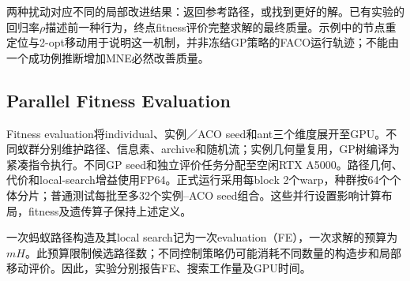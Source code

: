 两种扰动对应不同的局部改进结果：返回参考路径，或找到更好的解。已有实验的回归率$\rho$描述前一种行为，终点fitness评价完整求解的最终质量。示例中的节点重定位与2-opt移动用于说明这一机制，并非冻结GP策略的FACO运行轨迹；不能由一个成功例推断增加MNE必然改善质量。



\subsection{Parallel Fitness Evaluation}
Fitness evaluation将individual、实例／ACO seed和ant三个维度展开至GPU。不同蚁群分别维护路径、信息素、archive和随机流；实例几何量复用，GP树编译为紧凑指令执行。不同GP seed和独立评价任务分配至空闲RTX A5000。路径几何、代价和local-search增益使用FP64。正式运行采用每block 2个warp，种群按64个个体分片；普通测试每批至多32个实例--ACO seed组合。这些并行设置影响计算布局，fitness及遗传算子保持上述定义。

一次蚂蚁路径构造及其local search记为一次evaluation（FE），一次求解的预算为$mH$。此预算限制候选路径数；不同控制策略仍可能消耗不同数量的构造步和局部移动评价。因此，实验分别报告FE、搜索工作量及GPU时间。
